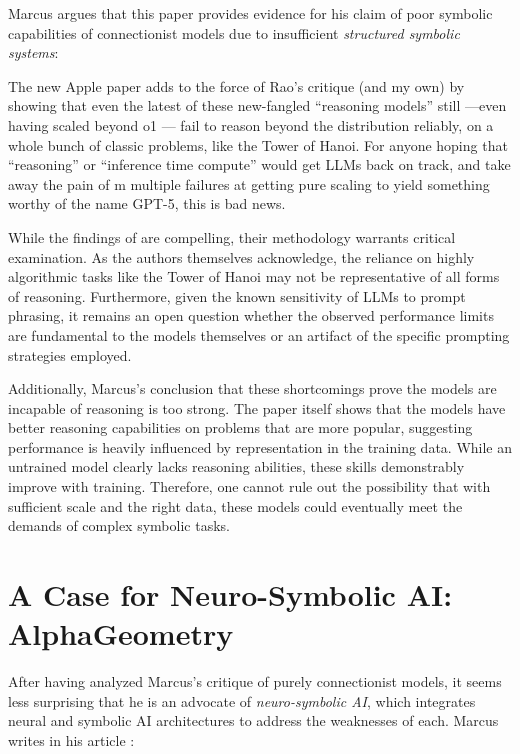 \documentclass[../../main.tex]{subfiles}
\begin{document}
Marcus argues that this paper provides evidence for his claim of poor symbolic capabilities of connectionist models due to insufficient \emph{structured symbolic systems}:

\begin{citecallout}
    The new Apple paper adds to the force of Rao's critique (and my own) by showing that even the latest of these new-fangled “reasoning models” still —even having scaled beyond o1 — fail to reason beyond the distribution reliably, on a whole bunch of classic problems, like the Tower of Hanoi. For anyone hoping that “reasoning” or “inference time compute” would get LLMs back on track, and take away the pain of m multiple failures at getting pure scaling to yield something worthy of the name GPT-5, this is bad news.
\end{citecallout}

\begin{critique}
    While the findings of \textcite{illusion-of-thinking} are compelling, their methodology warrants critical examination. As the authors themselves acknowledge, the reliance on highly algorithmic tasks like the Tower of Hanoi may not be representative of all forms of reasoning. Furthermore, given the known sensitivity of LLMs to prompt phrasing, it remains an open question whether the observed performance limits are fundamental to the models themselves or an artifact of the specific prompting strategies employed.

    Additionally, Marcus's conclusion that these shortcomings prove the models are incapable of reasoning is too strong. The paper itself shows that the models have better reasoning capabilities on problems that are more popular, suggesting performance is heavily influenced by representation in the training data. While an untrained model clearly lacks reasoning abilities, these skills demonstrably improve with training. Therefore, one cannot rule out the possibility that with sufficient scale and the right data, these models could eventually meet the demands of complex symbolic tasks.
\end{critique}

\section{A Case for Neuro-Symbolic AI: AlphaGeometry}
After having analyzed Marcus's critique of purely connectionist models, it seems less surprising that he is an advocate of \emph{neuro-symbolic AI}, which integrates neural and symbolic AI architectures to address the weaknesses of each. Marcus writes in his article :
\end{document}
